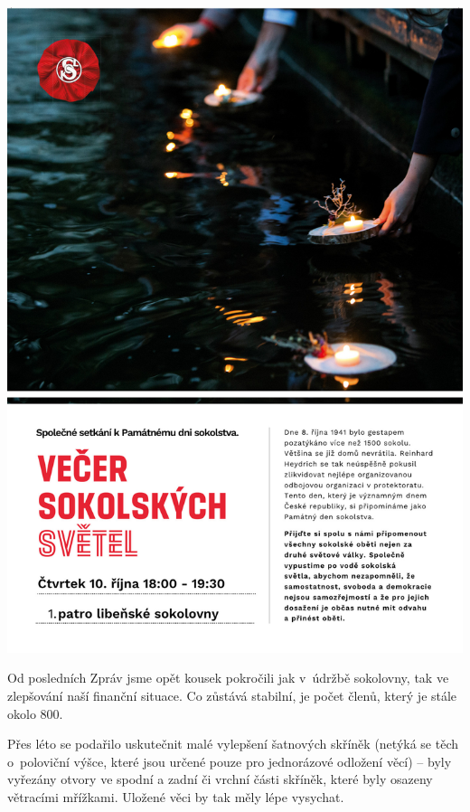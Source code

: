 \documentclass[11pt]{article}
\begin{document}
\pagestyle{blank}
\begin{center}
  \noindent\includegraphics[width=\linewidth]{pamatny-den-sokolstva.jpg}
\end{center}
\restoregeometry

\clearpage
\pagestyle{standard}



Od posledních Zpráv jsme opět kousek pokročili jak v~údržbě sokolovny, tak ve zlepšování naší finanční situace. Co zůstává stabilní, je počet členů, který je stále okolo 800.

Přes léto se podařilo uskutečnit malé vylepšení šatnových skříněk (netýká se těch o~poloviční výšce, které jsou určené pouze pro jednorázové odložení věcí) – byly vyřezány otvory ve spodní a zadní či vrchní části skříněk, které byly osazeny větracími mřížkami. Uložené věci by tak měly lépe vysychat.
\end{document}
